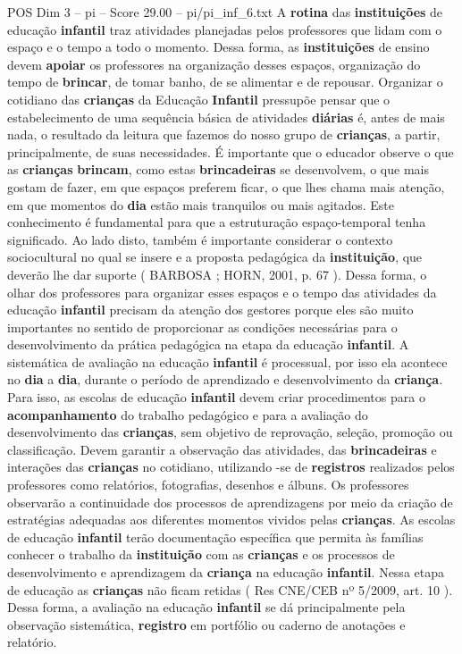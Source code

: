 \begin{textsample}{POS Dim 3 – pi – Score 29.00 – pi/pi\_inf\_6.txt}
A \textbf{rotina} das \textbf{instituições} de educação \textbf{infantil} traz atividades planejadas pelos professores que lidam com o espaço e o tempo a todo o momento.
Dessa forma, as \textbf{instituições} de ensino devem \textbf{apoiar} os professores na organização desses espaços, organização do tempo de \textbf{brincar}, de tomar banho, de se alimentar e de repousar.
Organizar o cotidiano das \textbf{crianças} da Educação \textbf{Infantil} pressupõe pensar que o estabelecimento de uma sequência básica de atividades \textbf{diárias} é, antes de mais nada, o resultado da leitura que fazemos do nosso grupo de \textbf{crianças}, a partir, principalmente, de suas necessidades.
É importante que o educador observe o que as \textbf{crianças} \textbf{brincam}, como estas \textbf{brincadeiras} se desenvolvem, o que mais gostam de fazer, em que espaços preferem ficar, o que lhes chama mais atenção, em que momentos do \textbf{dia} estão mais tranquilos ou mais agitados.
Este conhecimento é fundamental para que a estruturação espaço-temporal tenha significado.
Ao lado disto, também é importante considerar o contexto sociocultural no qual se insere e a proposta pedagógica da \textbf{instituição}, que deverão lhe dar suporte ( BARBOSA ; HORN, 2001, p. 67 ).
Dessa forma, o olhar dos professores para organizar esses espaços e o tempo das atividades da educação \textbf{infantil} precisam da atenção dos gestores porque eles são muito importantes no sentido de proporcionar as condições necessárias para o desenvolvimento da prática pedagógica na etapa da educação \textbf{infantil}.
A sistemática de avaliação na educação \textbf{infantil} é processual, por isso ela acontece no \textbf{dia} a \textbf{dia}, durante o período de aprendizado e desenvolvimento da \textbf{criança}.
Para isso, as escolas de educação \textbf{infantil} devem criar procedimentos para o \textbf{acompanhamento} do trabalho pedagógico e para a avaliação do desenvolvimento das \textbf{crianças}, sem objetivo de reprovação, seleção, promoção ou classificação.
Devem garantir a observação das atividades, das \textbf{brincadeiras} e interações das \textbf{crianças} no cotidiano, utilizando -se de \textbf{registros} realizados pelos professores como relatórios, fotografias, desenhos e álbuns.
Os professores observarão a continuidade dos processos de aprendizagens por meio da criação de estratégias adequadas aos diferentes momentos vividos pelas \textbf{crianças}.
As escolas de educação \textbf{infantil} terão documentação específica que permita às famílias conhecer o trabalho da \textbf{instituição} com as \textbf{crianças} e os processos de desenvolvimento e aprendizagem da \textbf{criança} na educação \textbf{infantil}.
Nessa etapa de educação as \textbf{crianças} não ficam retidas ( Res CNE/CEB nº 5/2009, art. 10 ).
Dessa forma, a avaliação na educação \textbf{infantil} se dá principalmente pela observação sistemática, \textbf{registro} em portfólio ou caderno de anotações e relatório.


\end{textsample}
